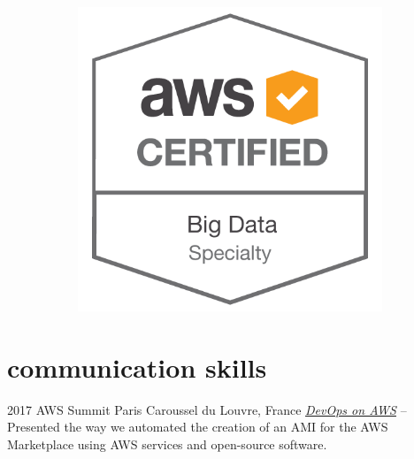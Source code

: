\documentclass[print]{cv-a4}
\begin{document}
\begin{figure}[h!]
\begin{subfigure}[b]{0.2\linewidth}
  \end{subfigure}
  \begin{subfigure}[b]{0.2\linewidth}
    \includegraphics[width=\linewidth]{images/BDS.png}
  \end{subfigure}
\end{figure}



\section{communication skills}

\begin{entrylist}


\entry
{2017}
{AWS Summit Paris}
{Caroussel du Louvre, France}
{\emph{\href{https://youtu.be/54cwFTMPxOo}{DevOps on AWS} } -- Presented the way we automated the creation of an AMI for the AWS Marketplace using AWS services and open-source software.}


\end{entrylist}
\end{document}
